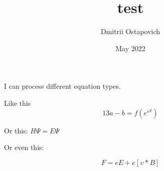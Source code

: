 \documentclass{article}
\title{test}
\author{Dmitrii Ostapovich}
\date{May 2022}
\begin{document}
\maketitle

I can process different equation types.

Like this
$$13a - b = f\left(e^{\omega t}\right)$$

Or this: $H\Psi = E\Psi$

Or even this:

\begin{equation}
    F = eE+e[\upsilon*B]
\end{equation}
\end{document}
